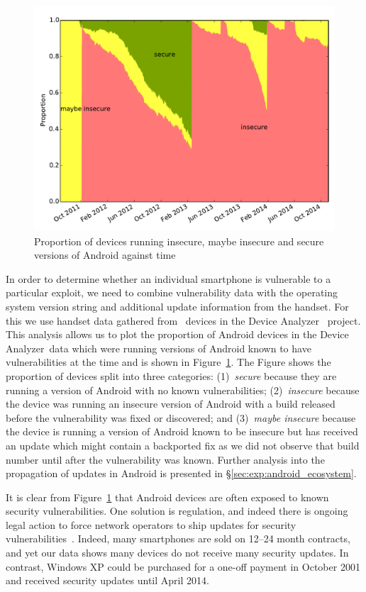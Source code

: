 \documentclass[conference,a4paper,twoside]{IEEEtran}
\let\OldTodo\todo
\renewcommand{\todo}{\OldTodo[inline]}
\newcommand{\todolater}[1]{}%
\newcommand{\da}{Device Analyzer}
\begin{document}
\begin{figure}[h]
\centering
\includegraphics[width=\columnwidth]{figures/proportioninsecure}
\caption{Proportion of devices running insecure, maybe insecure and secure versions of Android against time}
\label{fig:proportioninsecure}
\end{figure}

In order to determine whether an individual smartphone is vulnerable to a particular exploit, we need to combine vulnerability data with the operating system version string and additional update information from the handset. 
For this we use handset data gathered from \daNumOSDevices\ devices in the \da~\cite{Wagner2013} project.
This analysis allows us to plot the proportion of Android devices in the \da\ data which were running versions of Android known to have vulnerabilities at the time and is shown in Figure~\ref{fig:proportioninsecure}.
The Figure shows the proportion of devices split into three categories: 
(1)~\emph{secure} because they are running a version of Android with no known vulnerabilities; 
(2)~\emph{insecure} because the device was running an insecure version of Android with a build released before the vulnerability was fixed or discovered; and 
(3)~\emph{maybe insecure} because the device is running a version of Android known to be insecure but has received an update which might contain a backported fix as we did not observe that build number until after the vulnerability was known.
Further analysis into the propagation of updates in Android is presented in \S\ref{sec:exp:android_ecosystem}.

It is clear from Figure~\ref{fig:proportioninsecure} that Android devices are often exposed to known security vulnerabilities.
One solution is regulation, and indeed there is ongoing legal action to force network operators to ship updates for security vulnerabilities~\cite{Soghoian2013}.\todolater{Check on the status of this legal action}
Indeed, many smartphones are sold on 12--24 month contracts, and yet our data shows many devices do not receive many security updates. 
In contrast, Windows XP could be purchased for a one-off payment in October 2001 and received security updates until April 2014.
\end{document}

